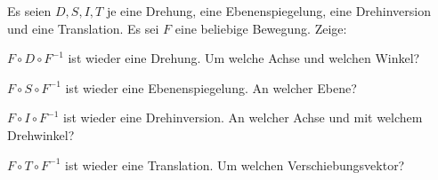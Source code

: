 \begin{sheet}
\begin{problem}[title={Konjugation geometrisch}, difficulty={mittel}]
Es seien $D,S,I,T$ je eine Drehung, eine Ebenenspiegelung, eine Drehinversion und eine Translation. Es sei $F$ eine beliebige Bewegung. Zeige:
\begin{subproblem}
$F\circ D\circ F^{-1}$ ist wieder eine Drehung. Um welche Achse und welchen Winkel?
\end{subproblem}
\begin{subproblem}
$F\circ S\circ F^{-1}$ ist wieder eine Ebenenspiegelung. An welcher Ebene?
\end{subproblem}
\begin{subproblem}
$F\circ I\circ F^{-1}$ ist wieder eine Drehinversion. An welcher Achse und mit welchem Drehwinkel?
\end{subproblem}
\begin{subproblem}
$F\circ T\circ F^{-1}$ ist wieder eine Translation. Um welchen Verschiebungsvektor?
\end{subproblem}
\end{problem}


\end{sheet}